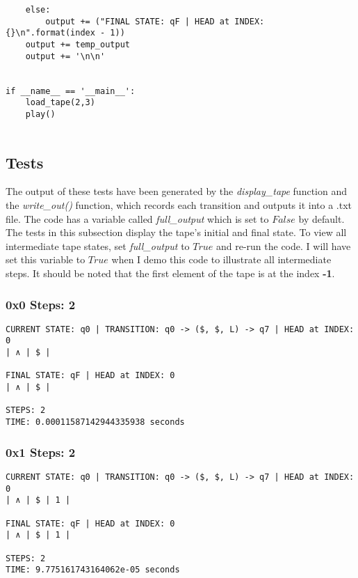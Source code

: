 \documentclass[a4paper,12pt]{article}
\begin{document}
\begin{lstlisting}
    else:
        output += ("FINAL STATE: qF | HEAD at INDEX: {}\n".format(index - 1))
    output += temp_output
    output += '\n\n'


if __name__ == '__main__':
    load_tape(2,3)
    play()


\end{lstlisting}

\newpage
{}
\subsection{Tests}
The output of these tests have been generated by the \textit{display\_tape} function and the \textit{write\_out()} function, which records each transition and outputs it into a .txt file. The code has a variable called \textit{full\_output} which is set to $False$ by default. 
The tests in this subsection display the tape's initial and final state. To view all intermediate tape states, set \textit{full\_output} to $True$ and re-run the code. I will have set this variable to $True$ when I demo this code to illustrate all intermediate steps.
\newline
It should be noted that the first element of the tape is at the index  \textbf{-1}.

\subsubsection{0x0 \textbar Steps: 2}
\begin{lstlisting}
CURRENT STATE: q0 | TRANSITION: q0 -> ($, $, L) -> q7 | HEAD at INDEX: 0
| ∧ | $ |

FINAL STATE: qF | HEAD at INDEX: 0
| ∧ | $ |

STEPS: 2
TIME: 0.00011587142944335938 seconds
\end{lstlisting}
\subsubsection{0x1 \textbar Steps: 2}
\begin{lstlisting}
CURRENT STATE: q0 | TRANSITION: q0 -> ($, $, L) -> q7 | HEAD at INDEX: 0
| ∧ | $ | 1 |

FINAL STATE: qF | HEAD at INDEX: 0
| ∧ | $ | 1 |

STEPS: 2
TIME: 9.775161743164062e-05 seconds

\end{lstlisting}
\end{document}
